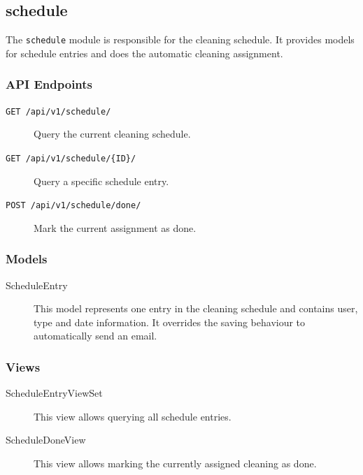 \subsection{schedule}\label{schedule}

The \texttt{schedule} module is responsible for the cleaning schedule.
It provides models for schedule entries and does the automatic cleaning
assignment.

\subsubsection{API Endpoints}\label{api-endpoints-1}

\begin{description}
\item[\texttt{GET\ /api/v1/schedule/}] Query the current cleaning schedule.

\item[\texttt{GET\ /api/v1/schedule/\{ID\}/}] Query a specific schedule entry.

\item[\texttt{POST\ /api/v1/schedule/done/}] Mark the current assignment as
done.
\end{description}

\subsubsection{Models}\label{models-3}

\begin{description}
\item[ScheduleEntry] This model represents one entry in the cleaning
schedule and contains user, type and date information. It overrides the
saving behaviour to automatically send an email.
\end{description}

\subsubsection{Views}\label{views-3}

\begin{description}
\item[ScheduleEntryViewSet] This view allows querying all schedule
entries.

\item[ScheduleDoneView] This view allows marking the currently
assigned cleaning as done.
\end{description}

